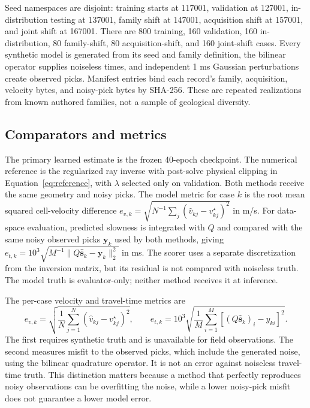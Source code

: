 \documentclass[11pt]{article}
\begin{document}
Seed namespaces are disjoint: training starts at 117001, validation at 127001, in-distribution testing at 137001, family shift at 147001, acquisition shift at 157001, and joint shift at 167001. There are 800 training, 160 validation, 160 in-distribution, 80 family-shift, 80 acquisition-shift, and 160 joint-shift cases. Every synthetic model is generated from its seed and family definition, the bilinear operator supplies noiseless times, and independent 1 ms Gaussian perturbations create observed picks. Manifest entries bind each record's family, acquisition, velocity bytes, and noisy-pick bytes by SHA-256. These are repeated realizations from known authored families, not a sample of geological diversity.

\subsection{Comparators and metrics}
\label{sec:metrics}
The primary learned estimate is the frozen 40-epoch checkpoint. The numerical reference is the regularized ray inverse with post-solve physical clipping in Equation~\ref{eq:reference}, with $\lambda$ selected only on validation. Both methods receive the same geometry and noisy picks. The model metric for case $k$ is the root mean squared cell-velocity difference $e_{v,k}=\sqrt{N^{-1}\sum_j(\widehat v_{kj}-v^{\star}_{kj})^2}$ in m/s. For data-space evaluation, predicted slowness is integrated with $Q$ and compared with the same noisy observed picks $\mathbf{y}_k$ used by both methods, giving $e_{t,k}=10^3\sqrt{M^{-1}\|Q\widehat{\mathbf{s}}_k-\mathbf{y}_k\|_2^2}$ in ms. The scorer uses a separate discretization from the inversion matrix, but its residual is not compared with noiseless truth. The model truth is evaluator-only; neither method receives it at inference.

The per-case velocity and travel-time metrics are
\begin{equation}
e_{v,k}=\sqrt{\frac{1}{N}\sum_{j=1}^{N}(\widehat v_{kj}-v^\star_{kj})^2},\qquad
e_{t,k}=10^3\sqrt{\frac{1}{M}\sum_{i=1}^{M}[(Q\widehat{\mathbf{s}}_k)_i-y_{ki}]^2}.
\label{eq:case-metrics}
\end{equation}
The first requires synthetic truth and is unavailable for field observations. The second measures misfit to the observed picks, which include the generated noise, using the bilinear quadrature operator. It is not an error against noiseless travel-time truth. This distinction matters because a method that perfectly reproduces noisy observations can be overfitting the noise, while a lower noisy-pick misfit does not guarantee a lower model error.
\end{document}
